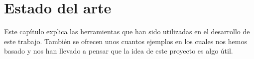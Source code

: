 %
%
%
%
%
%
%
%
%
%

\chapter{Estado del arte}
\label{cap2}

\begin{FraseCelebre}
\begin{Frase}
\end{Frase}
\begin{Fuente}
\end{Fuente}
\end{FraseCelebre}

\begin{resumen}
 Este cap\'itulo explica las herramientas que han sido utilizadas en el desarrollo de este trabajo. Tambi\'en se ofrecen unos cuantos ejemplos en los cuales nos hemos basado y nos han llevado a pensar que la idea de este proyecto es algo \'util.
\end{resumen}

